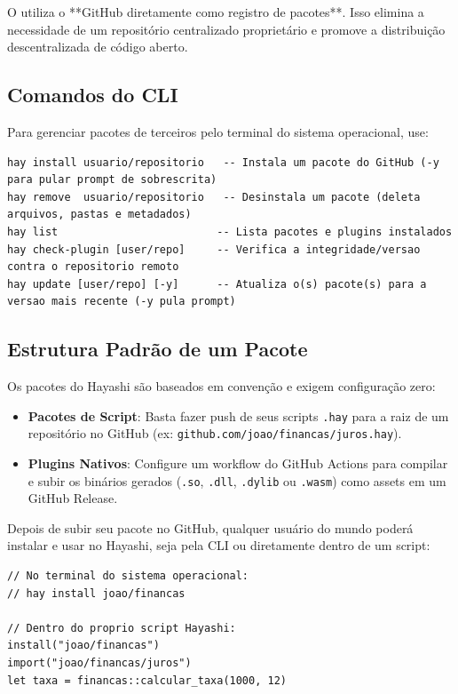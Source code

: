 O \hayashi{} utiliza o **GitHub diretamente como registro de pacotes**. Isso elimina a necessidade de um repositório centralizado proprietário e promove a distribuição descentralizada de código aberto.

\subsection{Comandos do CLI}
Para gerenciar pacotes de terceiros pelo terminal do sistema operacional, use:

\begin{lstlisting}[style=inline, numbers=none, frame=none]
hay install usuario/repositorio   -- Instala um pacote do GitHub (-y para pular prompt de sobrescrita)
hay remove  usuario/repositorio   -- Desinstala um pacote (deleta arquivos, pastas e metadados)
hay list                         -- Lista pacotes e plugins instalados
hay check-plugin [user/repo]     -- Verifica a integridade/versao contra o repositorio remoto
hay update [user/repo] [-y]      -- Atualiza o(s) pacote(s) para a versao mais recente (-y pula prompt)
\end{lstlisting}

\subsection{Estrutura Padrão de um Pacote}

Os pacotes do Hayashi são baseados em convenção e exigem configuração zero:
\begin{itemize}
  \item \textbf{Pacotes de Script}: Basta fazer push de seus scripts \texttt{.hay} para a raiz de um repositório no GitHub (ex: \texttt{github.com/joao/financas/juros.hay}).
  \item \textbf{Plugins Nativos}: Configure um workflow do GitHub Actions para compilar e subir os binários gerados (\texttt{.so}, \texttt{.dll}, \texttt{.dylib} ou \texttt{.wasm}) como assets em um GitHub Release.
\end{itemize}

Depois de subir seu pacote no GitHub, qualquer usuário do mundo poderá instalar e usar no Hayashi, seja pela CLI ou diretamente dentro de um script:
\begin{lstlisting}[caption={Instalando e importando um pacote}]
// No terminal do sistema operacional:
// hay install joao/financas

// Dentro do proprio script Hayashi:
install("joao/financas")
import("joao/financas/juros")
let taxa = financas::calcular_taxa(1000, 12)
\end{lstlisting}

